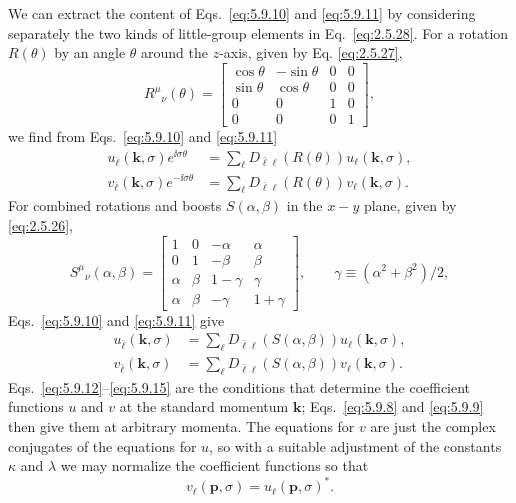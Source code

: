 We can extract the content of Eqs.~\eqref{eq:5.9.10} and \eqref{eq:5.9.11} by considering
separately the two kinds of little-group elements in Eq.~\eqref{eq:2.5.28}. For a
rotation $R(\theta)$ by an angle $\theta$ around the $z$-axis, given by Eq.
\eqref{eq:2.5.27},
\[
R^\mu{}_\nu(\theta)=
\begin{bmatrix}
\cos\theta&-\sin\theta&0&0\\
\sin\theta&\cos\theta&0&0\\
0&0&1&0\\
0&0&0&1
\end{bmatrix},
\]
we find from Eqs.~\eqref{eq:5.9.10} and \eqref{eq:5.9.11}
\begin{align}
u_{\bar\ell}(\mathbf k,\sigma)e^{\ii\sigma\theta}
&=\sum_\ell D_{\bar\ell\ell}(R(\theta))u_\ell(\mathbf k,\sigma),
\tag{5.9.12}\label{eq:5.9.12}\\
v_{\bar\ell}(\mathbf k,\sigma)e^{-\ii\sigma\theta}
&=\sum_\ell D_{\bar\ell\ell}(R(\theta))v_\ell(\mathbf k,\sigma).
\tag{5.9.13}\label{eq:5.9.13}
\end{align}
For combined rotations and boosts $S(\alpha,\beta)$ in the $x-y$ plane, given
by \eqref{eq:2.5.26},
\[
S^\mu{}_\nu(\alpha,\beta)=
\begin{bmatrix}
1&0&-\alpha&\alpha\\
0&1&-\beta&\beta\\
\alpha&\beta&1-\gamma&\gamma\\
\alpha&\beta&-\gamma&1+\gamma
\end{bmatrix},
\qquad \gamma\equiv(\alpha^2+\beta^2)/2,
\]
Eqs.~\eqref{eq:5.9.10} and \eqref{eq:5.9.11} give
\begin{align}
u_{\bar\ell}(\mathbf k,\sigma)&=
\sum_\ell D_{\bar\ell\ell}(S(\alpha,\beta))u_\ell(\mathbf k,\sigma),
\tag{5.9.14}\label{eq:5.9.14}\\
v_{\bar\ell}(\mathbf k,\sigma)&=
\sum_\ell D_{\bar\ell\ell}(S(\alpha,\beta))v_\ell(\mathbf k,\sigma).
\tag{5.9.15}\label{eq:5.9.15}
\end{align}
Eqs.~\eqref{eq:5.9.12}--\eqref{eq:5.9.15} are the conditions that determine the coefficient
functions $u$ and $v$ at the standard momentum $\mathbf k$; Eqs.~\eqref{eq:5.9.8} and
\eqref{eq:5.9.9} then give them at arbitrary momenta. The equations for $v$ are just the
complex conjugates of the equations for $u$, so with a suitable adjustment of
the constants $\kappa$ and $\lambda$ we may normalize the coefficient
functions so that
\begin{equation}
v_\ell(\mathbf p,\sigma)=u_\ell(\mathbf p,\sigma)^*.
\tag{5.9.16}\label{eq:5.9.16}
\end{equation}

